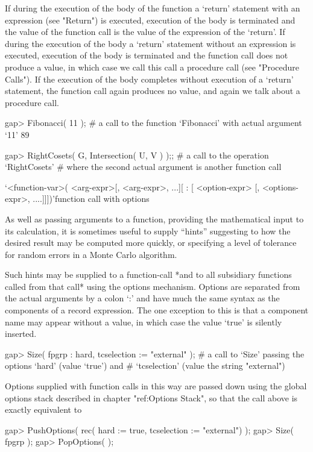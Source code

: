 {If during the execution of the body of the function a `return' statement
with an expression (see "Return") is executed, execution of the body is
terminated and the value of the function call is the value of the
expression of the `return'. If during the execution of the body a
`return' statement without an expression is executed, execution of the
body is terminated and the function call does not produce a value, in
which case we call this call a procedure call (see "Procedure Calls").
If the execution of the body completes without execution of a `return'
statement, the function call again produces no value, and again we talk
about a procedure call.

\beginexample
gap> Fibonacci( 11 );
  # a call to the function `Fibonacci' with actual argument `11'
89
\endexample

\begintt
gap> RightCosets( G, Intersection( U, V ) );;
  # a call to the operation `RightCosets'
  # where the second actual argument is another function call
\endtt

\>`<function-var>( <arg-expr>[, <arg-expr>, ...][ : [ <option-expr> [, <options-expr>, ....]]])'{function call with options}

As well as passing arguments to a function, providing the mathematical 
input to its calculation, it is sometimes useful to supply ``hints''
suggesting to {\GAP} how the desired result may be computed more
quickly, or specifying a level of tolerance for random errors in a
Monte Carlo algorithm.

Such hints may be supplied to a function-call *and to all subsidiary
functions called from that call* using the options mechanism. Options
are separated from the actual arguments by a colon `:' and have much
the same syntax as the components of a record expression. The one
exception to this is that a component name may appear without a value,
in which case the value `true' is silently inserted.

\begintt
gap> Size( fpgrp : hard, tcselection := "external" );
  # a call to `Size' passing the options `hard' (value `true') and 
  # `tcselection' (value the string "external")
\endtt

Options supplied with function calls in this way are passed down using 
the global options stack described in chapter "ref:Options Stack", so that
the call above is exactly equivalent to

\begintt
gap> PushOptions( rec( hard := true, tcselection := "external") );
gap> Size( fpgrp );
gap> PopOptions( );
\endtt

}
